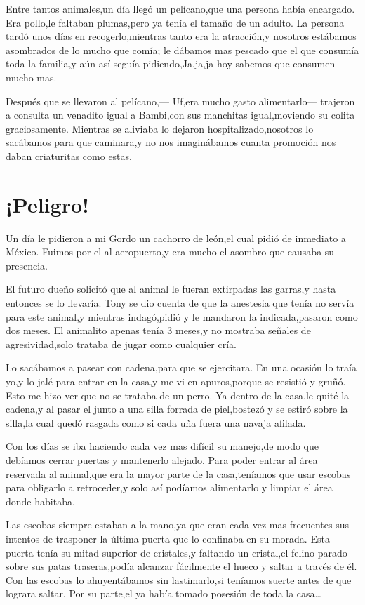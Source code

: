 \documentclass[letterpaper,12pt]{book}
\begin{document}
Entre tantos animales,un día llegó un pelícano,que una persona había encargado. Era pollo,le faltaban plumas,pero ya tenía el tamaño de un adulto.
 La persona tardó unos días en recogerlo,mientras tanto era la atracción,y nosotros estábamos asombrados de lo mucho que comía; le dábamos mas pescado que el que consumía toda la familia,y aún así seguía pidiendo,Ja,ja,ja hoy sabemos que consumen mucho mas.
 
 Después que se llevaron al pelícano,--- Uf,era mucho gasto alimentarlo--- trajeron a consulta un venadito igual a Bambi,con sus manchitas igual,moviendo su colita graciosamente. Mientras se aliviaba lo dejaron hospitalizado,nosotros lo sacábamos para que caminara,y no nos imaginábamos cuanta promoción nos daban criaturitas como estas.
\chapter{¡Peligro!}
Un día le pidieron a mi Gordo un cachorro de león,el cual pidió de inmediato a México. Fuimos por el al aeropuerto,y era mucho el asombro que causaba su presencia.

El futuro dueño solicitó que al animal le fueran extirpadas las garras,y hasta entonces se lo llevaría. Tony se dio cuenta de que la anestesia que tenía no servía para este animal,y mientras indagó,pidió y le mandaron la indicada,pasaron como dos meses. El animalito apenas tenía 3 meses,y no mostraba señales de agresividad,solo trataba de jugar como cualquier cría.

Lo sacábamos a pasear con cadena,para que se ejercitara. En una ocasión lo traía yo,y lo jalé para entrar en la casa,y me vi en apuros,porque se resistió y gruñó. Esto me hizo ver que no se trataba de un perro. Ya dentro de la casa,le quité la cadena,y al pasar el junto a una silla forrada de piel,bostezó y se estiró sobre la silla,la cual quedó rasgada como si cada uña fuera una navaja afilada.

Con los días se iba haciendo cada vez mas difícil su manejo,de modo que debíamos cerrar puertas y mantenerlo alejado. Para poder entrar al área reservada al animal,que era la mayor parte de la casa,teníamos que usar escobas para obligarlo a retroceder,y solo así podíamos alimentarlo y limpiar el área donde habitaba.

Las escobas siempre estaban a la mano,ya que eran cada vez mas frecuentes sus intentos de trasponer la última puerta que lo confinaba en su morada. Esta puerta tenía su mitad superior de cristales,y faltando un cristal,el felino parado sobre sus patas traseras,podía alcanzar fácilmente el hueco y saltar a través de él. Con las escobas lo ahuyentábamos sin lastimarlo,si teníamos suerte antes de que lograra saltar. Por su parte,el ya había tomado posesión de toda la casa\ldots
\end{document}
